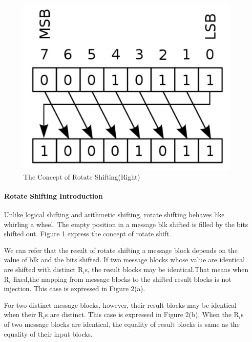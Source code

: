 \documentclass{article}
\begin{document}
\begin{figure}[htbp]
 \centering
 \includegraphics[scale=0.4]{./diagrams/rotate_right.pdf}
 \caption{The Concept of Rotate Shifting(Right)}
 \label{fig:1 }
\end{figure}

\paragraph{Rotate Shifting Introduction} 
Unlike logical shifting and arithmetic shifting, rotate shifting
behaves like whirling a wheel. The empty position in a message blk shifted is
filled by the bits shifted out. Figure 1 express the concept of rotate shift.

We can refer that the result of rotate shifting a message block depends on the
value of blk and the bits shifted.  If two message blocks whose value are
identical are shifted with distinct R$_i$s, the result blocks may be
identical.That means when R$_i$ fixed,the mapping from message blocks to the
shifted result blocks is not injection. This case is expressed in Figure 2(a).

For two distinct message blocks, however, their result blocks may be identical
when their R$_i$s are distinct. This case is expressed in Figure 2(b).  
When the R$_i$s of two message blocks are identical, the equality of result blocks
is same as the equality of their input blocks.				
\end{document}
